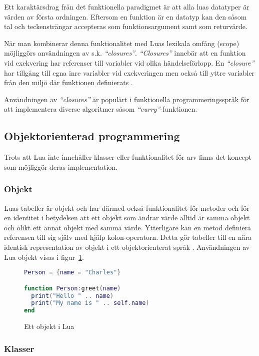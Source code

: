 Ett karaktärsdrag från det funktionella paradigmet är att alla luas datatyper
är värden av första ordningen. Eftersom en funktion är en datatyp kan den såsom
tal och teckensträngar accepteras som funktionsargument samt som returvärde.

När man kombinerar denna funktionalitet med Luas lexikala omfång (scope)
möjliggörs användningen av s.k. \textit{``closures''}. \textit{``Closures''}
innebär att en funktion vid exekvering har referenser till variabler vid olika
händelseförlopp. En \textit{``closure''} har tillgång till egna inre variabler
vid exekveringen men också till yttre variabler från den miljö där funktionen
definierats \citep[s. 45]{ir06}.

Användningen av \textit{``closures''} är populärt i funktionella programmeringsspråk för
att implementera diverse algoritmer såsom \textit{``curry''}-funktionen.

\subsection{Objektorienterad programmering}

Trots att Lua inte innehåller klasser eller funktionalitet för arv finns det
koncept som möjliggör deras implementation.

\subsubsection{Objekt}

Luas tabeller är objekt och har därmed också funktionalitet för metoder och
för en identitet i betydelsen att ett objekt som ändrar värde alltid är samma
objekt och olikt ett annat objekt med samma värde. Ytterligare kan en metod
definiera referensen till sig själv med hjälp kolon-operatorn. Detta gör
tabeller till en nära identisk representation av objekt i ett objektorienterat
språk \citep[s. 149]{ir06}. Användningen av Lua objekt visas i
figur~\ref{fig:luaobject}.

\begin{figure}[ht]
  \begin{lstlisting}[language=Lua]
Person = {name = "Charles"}

function Person:greet(name)
  print("Hello " .. name)
  print("My name is " .. self.name)
end
  \end{lstlisting}
  \caption{Ett objekt i Lua}
  \label{fig:luaobject}
\end{figure}

\subsubsection{Klasser}

